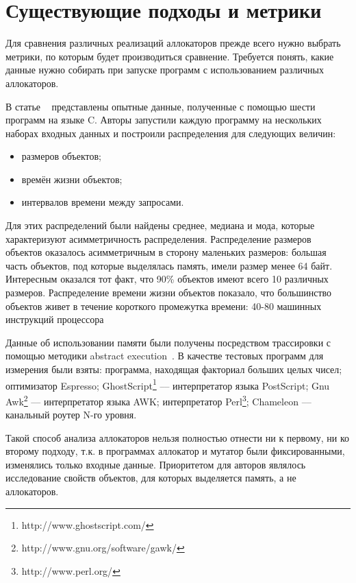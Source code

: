   
   \section{Существующие подходы и метрики}
   Для сравнения различных реализаций аллокаторов прежде всего нужно выбрать метрики, по которым будет 
   производиться сравнение. Требуется понять, какие данные нужно собирать при запуске программ
   с использованием различных аллокаторов.
   
   В статье ~\cite{six_progs} представлены опытные данные, полученные с помощью шести программ на языке
   C. Авторы запустили каждую программу на нескольких наборах входных данных и построили распределения для следующих величин:
   
   \begin{itemize}
   \item размеров объектов;
   \item времён жизни объектов;
   \item интервалов времени между запросами.
   \end{itemize}
   
   Для этих распределений были найдены среднее, медиана и мода, которые характеризуют асимметричность распределения. Распределение размеров 
   объектов оказалось асимметричным 
   в сторону маленьких размеров: большая часть объектов, под которые выделялась память, имели размер менее 64 байт. Интересным
   оказался тот факт, что 90\% объектов имеют всего 10 различных размеров. Распределение времени жизни
   объектов показало, что большинство объектов живет в течение короткого промежутка времени: 40-80 машинных инструкций процессора 
   
   Данные об использовании памяти были получены посредством трассировки с помощью методики abstract execution~\cite{ae}. В качестве 
   тестовых программ для измерения были взяты: программа, находящая факториал больших целых чисел; оптимизатор Espresso; 
   GhostScript\footnote{http://www.ghostscript.com/} –-- интерпретатор языка PostScript; Gnu Awk\footnote{http://www.gnu.org/software/gawk/} –-- 
   интерпретатор языка AWK; интерпретатор Perl\footnote{http://www.perl.org/}; Chameleon –-- канальный роутер N-го уровня.
   
   Такой способ анализа аллокаторов нельзя полностью отнести ни к первому, ни ко второму подходу, т.к. в программах аллокатор и мутатор
   были фиксированными, изменялись только входные данные. Приоритетом для авторов являлось исследование свойств объектов, для которых выделяется
   память, а не аллокаторов.
   
